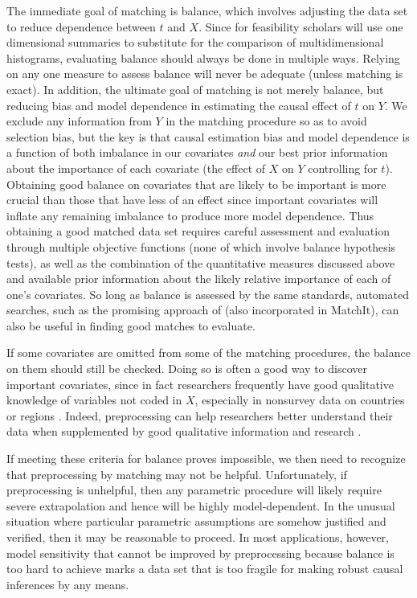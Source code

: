 \documentclass[11pt,titlepage]{article}
\begin{document}
The immediate goal of matching is balance, which involves adjusting
the data set to reduce dependence between $t$ and $X$.  Since for
feasibility scholars will use one dimensional summaries to substitute
for the comparison of multidimensional histograms, evaluating balance
should always be done in multiple ways.  Relying on any one measure to
assess balance will never be adequate (unless matching is exact).  In
addition, the ultimate goal of matching is not merely balance, but
reducing bias and model dependence in estimating the causal effect of
$t$ on $Y$.  We exclude any information from $Y$ in the matching
procedure so as to avoid selection bias, but the key is that causal
estimation bias and model dependence is a function of both imbalance
in our covariates \emph{and} our best prior information about the
importance of each covariate (the effect of $X$ on $Y$ controlling for
$t$).  Obtaining good balance on covariates that are likely to be
important is more crucial than those that have less of an effect since
important covariates will inflate any remaining imbalance to produce
more model dependence.  Thus obtaining a good matched data set
requires careful assessment and evaluation through multiple objective
functions (none of which involve balance hypothesis tests), as well as
the combination of the quantitative measures discussed above and
available prior information about the likely relative importance of
each of one's covariates.  So long as balance is assessed by the same
standards, automated searches, such as the promising approach of
\citet{DiaSek05} (also incorporated in MatchIt), can also be useful in
finding good matches to evaluate.

If some covariates are omitted from some of the matching procedures,
the balance on them should still be checked.  Doing so is often a good
way to discover important covariates, since in fact researchers
frequently have good qualitative knowledge of variables not coded in
$X$, especially in nonsurvey data on countries or regions
\citep[][Ch.3]{Rosenbaum02}.  Indeed, preprocessing can help
researchers better understand their data when supplemented by good
qualitative information and research \citep[e.g.,][]{RosSil01}.

If meeting these criteria for balance proves impossible, we then need
to recognize that preprocessing by matching may not be helpful.
Unfortunately, if preprocessing is unhelpful, then any parametric
procedure will likely require severe extrapolation and hence will be
highly model-dependent.  In the unusual situation where particular
parametric assumptions are somehow justified and verified, then it may
be reasonable to proceed.  In most applications, however, model
sensitivity that cannot be improved by preprocessing because balance
is too hard to achieve marks a data set that is too fragile for making
robust causal inferences by any means.
\end{document}
